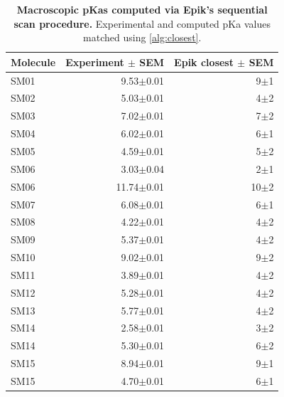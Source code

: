 \documentclass[9pt,lineno,final]{elife}
\begin{document}
    
\begin{table}[H]
	\centering
	\caption{{\bf Macroscopic pKas computed via Epik's sequential scan procedure.}
		Experimental and computed pKa values matched using \cref{alg:closest}.}
	\small
	\label{tab:molecule-macro}
	\begin{tabular}{lrr}
		\toprule
		{\bf Molecule} & {\bf Experiment $\pm$ SEM} & {\bf Epik closest $\pm$ SEM} \\
		\midrule
		SM01           & 9.53$\pm$0.01            & 9$\pm$1                  \\
		SM02           & 5.03$\pm$0.01            & 4$\pm$2                  \\
		SM03           & 7.02$\pm$0.01            & 7$\pm$2                  \\
		SM04           & 6.02$\pm$0.01            & 6$\pm$1                  \\
		SM05           & 4.59$\pm$0.01            & 5$\pm$2                  \\
		SM06           & 3.03$\pm$0.04              & 2$\pm$1                  \\
		SM06           & 11.74$\pm$0.01           & 10$\pm$2                 \\
		SM07           & 6.08$\pm$0.01            & 6$\pm$1                  \\
		SM08           & 4.22$\pm$0.01            & 4$\pm$2                  \\
		SM09           & 5.37$\pm$0.01            & 4$\pm$2                  \\
		SM10           & 9.02$\pm$0.01            & 9$\pm$2                  \\
		SM11           & 3.89$\pm$0.01            & 4$\pm$2                 \\
		SM12           & 5.28$\pm$0.01            & 4$\pm$2                  \\
		SM13           & 5.77$\pm$0.01            & 4$\pm$2                  \\
		SM14           & 2.58$\pm$0.01           & 3$\pm$2                  \\
		SM14           & 5.30$\pm$0.01            & 6$\pm$2                  \\
		SM15           & 8.94$\pm$0.01            & 9$\pm$1                  \\
		SM15           & 4.70$\pm$0.01            & 6$\pm$1                  \\

\end{tabular}
\end{table}
\end{document}
